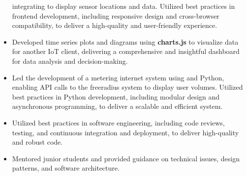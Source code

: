 \begin{itemize}
        integrating  to display sensor locations and data.
        Utilized best practices in frontend development, including responsive design and cross-browser compatibility, to deliver a high-quality and user-friendly experience.
  \item Developed time series plots and diagrams using \textbf{charts.js} to visualize data for another IoT client,
        delivering a comprehensive and insightful dashboard for data analysis and decision-making.
  \item Led the development of a metering internet system using  and Python,
        enabling API calls to the freeradius system to display user volumes.
        Utilized best practices in Python development, including modular design and asynchronous programming,
        to deliver a scalable and efficient system.
  \item Utilized best practices in software engineering, including code reviews, testing, and continuous
        integration and deployment, to deliver high-quality and robust code.
  \item Mentored junior students and provided guidance on technical issues,
        design patterns, and software architecture.
\end{itemize}
